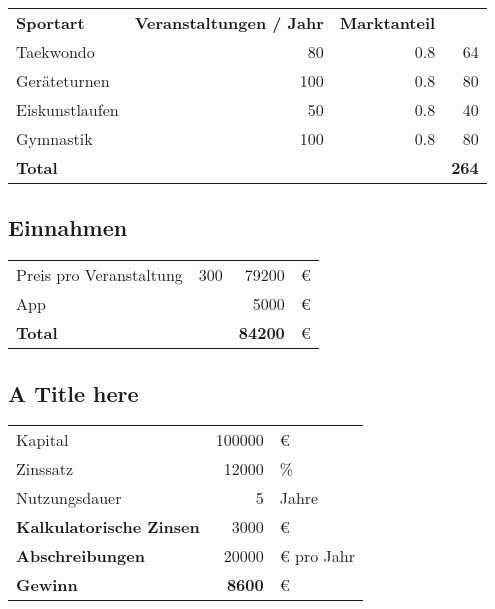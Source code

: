 \begin{table}[H]

    \begin{tabular}{l r r r}
        \textbf{Sportart}       & \textbf{Veranstaltungen / Jahr}   & \textbf{Marktanteil}      &  \\
        Taekwondo               & 80                                & 0.8                       & 64\\
        Geräteturnen            & 100                               & 0.8                       & 80\\
        Eiskunstlaufen          & 50                                & 0.8                       & 40\\
        Gymnastik               & 100                               & 0.8                       & 80\\
        \midrule
        \textbf{Total}          &                                   &                           & \textbf{264}
    \end{tabular}
    \label{tab:Markt}
\end{table}

\subsection{Einnahmen}

\begin{table}[H]

    \begin{tabular}{l r r l}
        Preis pro Veranstaltung & 300       & 79200 & €\\
        App                     &           & 5000  & €\\
        \midrule
        \textbf{Total}          &           & \textbf{84200}  & €
    \end{tabular}
    \label{tab:einnahmen}
\end{table}


\subsection{A Title here}

\begin{table}[H]

    \begin{tabular}{l r l}
        Kapital                 & 100000    & €\\
        Zinssatz                & 12000     & \%\\
        Nutzungsdauer           & 5         & Jahre\\
        \midrule
        \textbf{Kalkulatorische Zinsen} & 3000 & €\\
        \textbf{Abschreibungen} & 20000 & € pro Jahr\\
        \midrule
        \textbf{Gewinn}         & \textbf{8600}  & €
    \end{tabular}
    \label{tab:bla}
\end{table}


